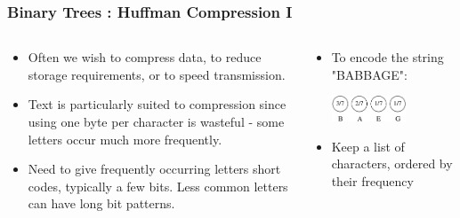 \begin{frame}[fragile]
\frametitle{Binary Trees : Huffman Compression I}
\begin{columns}[T]

\begin{column}{0.45\textwidth}
\begin{itemize}[<+->]
\item Often we wish to compress data, to reduce storage requirements, or to speed transmission.
\item  Text is particularly suited to compression since using one byte per character is wasteful - some letters occur much more frequently.
\item  Need to give frequently occurring letters short codes, typically a few bits. Less common letters can have long bit patterns.
\end{itemize}
\end{column}

\begin{column}{0.45\textwidth}
\begin{itemize}[<+->]
\item To encode the string "BABBAGE":

\vspace*{2ex}
\pause
\begin{center}
\includegraphics[width=0.6\textwidth]{../Images/huff1.pdf}
\end{center}
\item Keep a list of characters, ordered by their frequency
\end{itemize}
\end{column}

\end{columns}
\end{frame}


